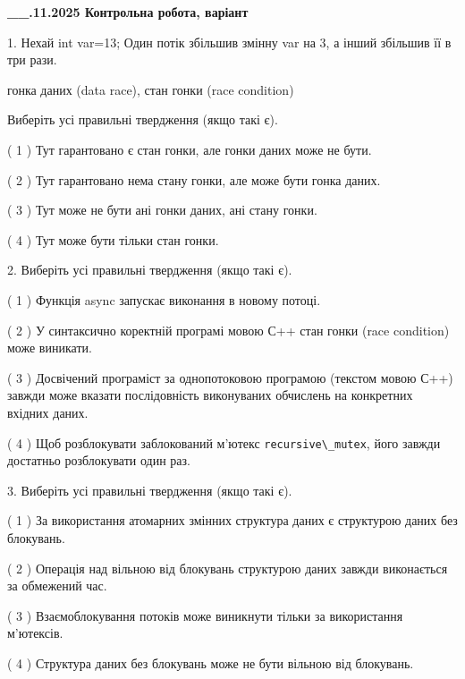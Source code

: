 \documentclass[12pt, ukrainian]{article}
\def\code#1{\Verb!#1!}
\begin{document}
\newpage
\begin {large}

\textbf{\_\_.11.2025 Контрольна робота, варіант  }\par


{
1. Нехай int var=13; Один потік збільшив змінну var на 3, а інший збільшив її в три рази.

гонка даних (data race), стан гонки (race condition)

Виберіть усі правильні твердження (якщо такі є).\par
\vspace{2mm}
( 1 ) Тут гарантовано є стан гонки, але гонки даних може не бути.%

( 2 ) Тут гарантовано нема стану гонки, але може бути гонка даних.%

( 3 ) Тут може не бути ані гонки даних, ані стану гонки.%

( 4 ) Тут може бути тільки стан гонки.%


2. Виберіть усі правильні твердження (якщо такі є).\par
\vspace{2mm}

( 1 ) Функція async запускає виконання в новому потоці.%

( 2 ) У синтаксично коректній програмі мовою С++ стан гонки (race condition) може виникати.%

( 3 ) Досвічений програміст за однопотоковою програмою (текстом мовою С++) завжди може вказати послідовність виконуваних обчислень на конкретних вхідних даних.%

( 4 ) Щоб розблокувати заблокований м’ютекс \code{recursive\_mutex}, його завжди достатньо розблокувати один раз.%


3. Виберіть усі правильні твердження (якщо такі є).\par
\vspace{2mm}

( 1 ) За використання атомарних змінних структура даних є структурою даних без блокувань.%

( 2 ) Операція над вільною від блокувань структурою даних завжди виконається за обмежений час.%

( 3 ) Взаємоблокування потоків може виникнути тільки за використання м’ютексів.%

( 4 ) Структура даних без блокувань може не бути вільною від блокувань.%


}
\end{large}
\end{document}
